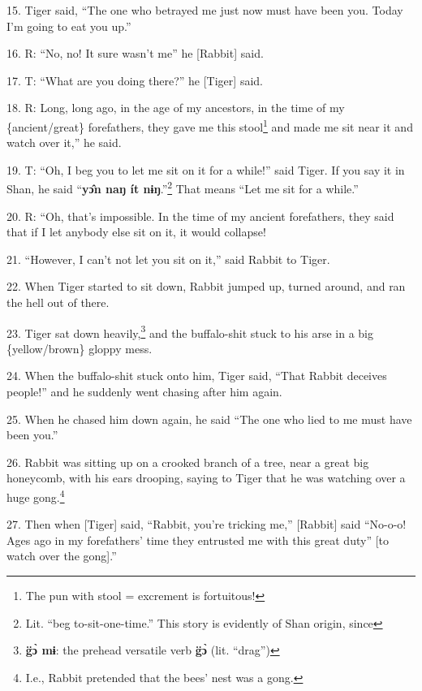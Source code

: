 15. Tiger said, ``The one who betrayed me just now must have been you. Today I'm
going to eat you up.''

16. R: ``No, no! It sure wasn't me'' he [Rabbit] said.

17. T: ``What are you doing there?'' he [Tiger] said.

18. R: Long, long ago, in the age of my ancestors, in the time of my \{ancient/great\}
forefathers, they gave me this stool\footnote{The pun with stool = excrement is fortuitous!} and made me sit near it and watch over
it,'' he said.

19. T: ``Oh, I beg you to let me sit on it for a while!'' said Tiger. If you say
it in Shan, he said ``\textbf{yɔ̂n naŋ ít nɨŋ}.''\footnote{Lit. ``beg to-sit-one-time.'' This story is evidently of Shan origin, since} That means ``Let me
sit for a while.''

20. R: ``Oh, that's impossible. In the time of my ancient forefathers, they said
that if I let anybody else sit on it, it would collapse!

21. ``However, I can't not let you sit on it,'' said Rabbit to Tiger.

22. When Tiger started to sit down, Rabbit jumped up, turned around, and ran the
hell out of there.

23. Tiger sat down heavily,\footnote{\textbf{  g̈ɔ̀ mɨ}: the prehead versatile verb \textbf{g̈ɔ̀} (lit. ``drag'')} and the buffalo-shit stuck to his arse in a big
\{yellow/brown\} gloppy mess.

24. When the buffalo-shit stuck onto him, Tiger said, ``That Rabbit deceives people!''
and he suddenly went chasing after him again.

25. When he chased him down again, he said ``The one who lied to me must have been
you.''

26. Rabbit was sitting up on a crooked branch of a tree, near a great big honeycomb,
with his ears drooping, saying to Tiger that he was watching over a huge gong.\footnote{I.e., Rabbit pretended that the bees' nest was a gong.}

27. Then when [Tiger] said, ``Rabbit, you're tricking me,'' [Rabbit] said ``No-o-o!
Ages ago in my forefathers' time they entrusted me with this great duty'' [to watch
over the gong].''

